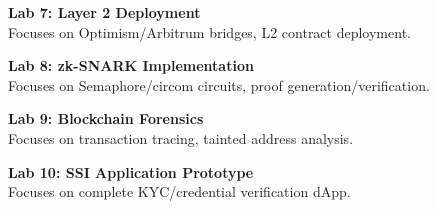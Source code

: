 \noindent\textbf{Lab 7: Layer 2 Deployment} \\
Focuses on Optimism/Arbitrum bridges, L2 contract deployment.

\vspace{0.2cm}

\noindent\textbf{Lab 8: zk-SNARK Implementation} \\
Focuses on Semaphore/circom circuits, proof generation/verification.

\vspace{0.2cm}

\noindent\textbf{Lab 9: Blockchain Forensics} \\
Focuses on transaction tracing, tainted address analysis.

\vspace{0.2cm}

\noindent\textbf{Lab 10: SSI Application Prototype} \\
Focuses on complete KYC/credential verification dApp.

\vspace{0.2cm}

\newpage
{}
